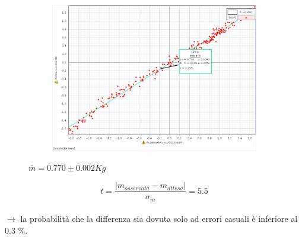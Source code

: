 \documentclass[a4paper]{article}
\theoremstyle{definition}
\begin{document}
\begin{figure}[!htbp]
{{			\begin{subfigure}{0.9\textwidth}
				\includegraphics[scale=0.45]{capstone_data/5005.png}
			\end{subfigure}%
		}
	}
\end{figure}

\begin{figure}[!htbp]
	\captionsetup{labelformat=empty}

	\caption{\(\bar{m} =  0.770 \pm 0.002 Kg\)}
	
\end{figure}

\[t = \frac{\left | m_{osservata} - m_{attesa} \right |}{\sigma_{m}}= 5.5\]\\
\noindent \(\rightarrow\) la probabilità che la differenza sia dovuta solo ad errori casuali è inferiore al 0.3 \(\%\).
\end{document}
